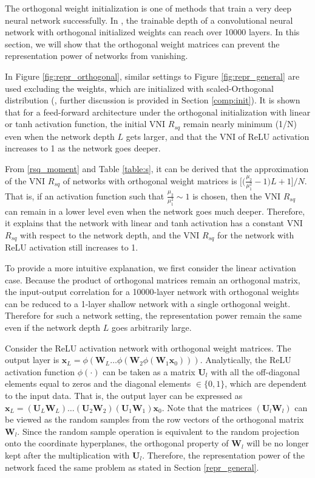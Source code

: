 The orthogonal weight initialization \cite{mft:linear} is one of methods that train a very
deep neural network successfully. In \cite{mft:cnn}, the trainable depth of a convolutional
neural network with orthogonal initialized weights can reach over 10000 layers. In this
section, we will show that the orthogonal weight matrices can prevent the representation
power of networks from vanishing.

In Figure \ref{fig:repr_orthogonal}, similar settings to Figure \ref{fig:repr_general} are 
used excluding the weights, which are initialized with scaled-Orthogonal distribution
(\cite{mft:linear}, further discussion is provided in Section \ref{comp:init}). It is shown
that for a feed-forward architecture under the orthogonal initialization with linear or tanh
activation function, the initial VNI $R_{sq}$ remain nearly
minimum (1/N) even when the network depth $L$ gets larger, and that the VNI of ReLU
activation increases to 1 as the network goes deeper.

From \eqref{rsq_moment} and Table \ref{table:s}, it can be derived that the approximation of
the VNI $R_{sq}$ of networks with orthogonal weight matrices is 
$\Big[\Big(\frac{\mu_2}{\mu_1^2}-1\Big)L+1\Big]\Big/N$. That is, if an activation function
such that $\frac{\mu_2}{\mu_1^2}\sim1$ is chosen, then the VNI $R_{sq}$ can remain
in a lower level even when the network goes much deeper. Therefore, it explains that the 
network with linear and tanh activation has a constant VNI $R_{sq}$ with respect to the
network depth, and the VNI $R_{sq}$ for the network with ReLU activation still increases
to 1.

To provide a more intuitive explanation, we first consider the linear activation case.
Because the product of orthogonal matrices remain an orthogonal matrix, the input-output
correlation for a 10000-layer network with orthogonal weights can be reduced to a 1-layer
shallow network with a single orthogonal weight. Therefore for such a network setting, the
representation power remain the same even if the network depth $L$ goes arbitrarily large.

Consider the ReLU activation network with orthogonal weight matrices. The output layer is
$\mathbf{x}_L=\phi(\mathbf{W}_L\dots\phi(\mathbf{W}_2\phi(\mathbf{W}_1\mathbf{x}_0)))$.
Analytically, the ReLU activation function $\phi(\cdot)$ can be taken as a matrix
$\mathbf{U}_l$ with all the off-diagonal elements equal to zeros and the diagonal elements
$\in\{0, 1\}$, which are dependent to the input data. That is, the output layer can be
expressed as
$\mathbf{x}_L=(\mathbf{U}_L\mathbf{W}_L)\dots(\mathbf{U}_2\mathbf{W}_2)(\mathbf{U}_1\mathbf{W}_1)\mathbf{x}_0$.
Note that the matrices $(\mathbf{U}_l\mathbf{W}_l)$ can be viewed as the random samples
from the row vectors of the orthogonal matrix $\mathbf{W}_l$.
Since the random sample operation is equivalent to the random projection onto the coordinate
hyperplanes, the orthogonal property of $\mathbf{W}_l$ will be no longer kept after the
multiplication with $\mathbf{U}_l$.
Therefore, the representation power of the network faced the same problem as stated in
Section \ref{repr_general}.

